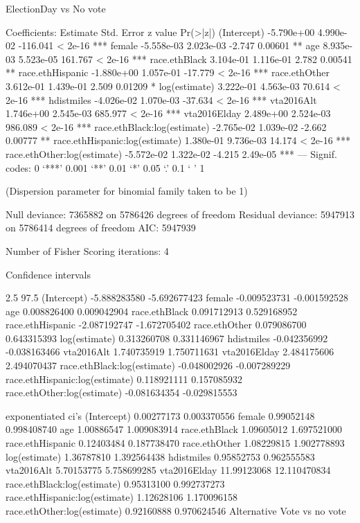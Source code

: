 ElectionDay vs No vote

Coefficients:
                                 Estimate Std. Error  z value Pr(>|z|)
(Intercept)                    -5.790e+00  4.990e-02 -116.041  < 2e-16 ***
female                         -5.558e-03  2.023e-03   -2.747  0.00601 **
age                             8.935e-03  5.523e-05  161.767  < 2e-16 ***
race.ethBlack                   3.104e-01  1.116e-01    2.782  0.00541 **
race.ethHispanic               -1.880e+00  1.057e-01  -17.779  < 2e-16 ***
race.ethOther                   3.612e-01  1.439e-01    2.509  0.01209 *
log(estimate)                   3.222e-01  4.563e-03   70.614  < 2e-16 ***
hdistmiles                     -4.026e-02  1.070e-03  -37.634  < 2e-16 ***
vta2016Alt                      1.746e+00  2.545e-03  685.977  < 2e-16 ***
vta2016Elday                    2.489e+00  2.524e-03  986.089  < 2e-16 ***
race.ethBlack:log(estimate)    -2.765e-02  1.039e-02   -2.662  0.00777 **
race.ethHispanic:log(estimate)  1.380e-01  9.736e-03   14.174  < 2e-16 ***
race.ethOther:log(estimate)    -5.572e-02  1.322e-02   -4.215 2.49e-05 ***
---
Signif. codes:  0 ‘***’ 0.001 ‘**’ 0.01 ‘*’ 0.05 ‘.’ 0.1 ‘ ’ 1

(Dispersion parameter for binomial family taken to be 1)

    Null deviance: 7365882  on 5786426  degrees of freedom
Residual deviance: 5947913  on 5786414  degrees of freedom
AIC: 5947939

Number of Fisher Scoring iterations: 4


Confidence intervals

                                    2.5       97.5
(Intercept)                    -5.888283580 -5.692677423
female                         -0.009523731 -0.001592528
age                             0.008826400  0.009042904
race.ethBlack                   0.091712913  0.529168952
race.ethHispanic               -2.087192747 -1.672705402
race.ethOther                   0.079086700  0.643315393
log(estimate)                   0.313260708  0.331146967
hdistmiles                     -0.042356992 -0.038163466
vta2016Alt                      1.740735919  1.750711631
vta2016Elday                    2.484175606  2.494070437
race.ethBlack:log(estimate)    -0.048002926 -0.007289229
race.ethHispanic:log(estimate)  0.118921111  0.157085932
race.ethOther:log(estimate)    -0.081634354 -0.029815553

exponentiated ci's
(Intercept)                     0.00277173  0.003370556
female                          0.99052148  0.998408740
age                             1.00886547  1.009083914
race.ethBlack                   1.09605012  1.697521000
race.ethHispanic                0.12403484  0.187738470
race.ethOther                   1.08229815  1.902778893
log(estimate)                   1.36787810  1.392564438
hdistmiles                      0.95852753  0.962555583
vta2016Alt                      5.70153775  5.758699285
vta2016Elday                   11.99123068 12.110470834
race.ethBlack:log(estimate)     0.95313100  0.992737273
race.ethHispanic:log(estimate)  1.12628106  1.170096158
race.ethOther:log(estimate)     0.92160888  0.970624546
Alternative Vote vs no vote


